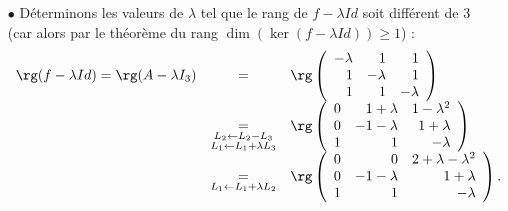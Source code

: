 \documentclass[a4paper, 11pt,reqno]{article}
\begin{document}
\begin{correction}
\begin{enumerate}
		      \begin{itemize}
			      \item[$\bullet$] D\'eterminons les valeurs de $\lambda$ tel que le rang de $f-\lambda Id$ soit diff\'erent de $3$ (car alors par le th\'eor\`eme du rang $\dim(\ker(f-\lambda Id))\geq 1$) :
			            $$ \begin{array}{ccl}
					            \rg(f-\lambda Id) = \rg(A-\lambda I_3) & =                                             & \rg\left(\begin{array}{rrr}
							                                                                                                              -\lambda & 1        & 1        \\
							                                                                                                              1        & -\lambda & 1        \\
							                                                                                                              1        & 1        & -\lambda
						                                                                                                              \end{array}\right) \\
					                                                   & \underset{\substack{L_2 \leftarrow L_2 - L_3                                            \\ L_1 \leftarrow L_1+\lambda L_3}}{=}&
					            \rg\left(\begin{array}{rrr}
							                     0 & 1 + \lambda & 1 - \lambda^2 \\
							                     0 & -1-\lambda  & 1+\lambda     \\
							                     1 & 1           & -\lambda
						                     \end{array}\right)                                                                                         \\
					                                                   & \underset{ L_1 \leftarrow L_1+\lambda L_2}{=} &
					            \rg\left(\begin{array}{rrr}
							                     0 & 0          & 2 +\lambda - \lambda^2 \\
							                     0 & -1-\lambda & 1+\lambda              \\
							                     1 & 1          & -\lambda
						                     \end{array}\right).

\end{array}$$
\end{itemize}
\end{enumerate}
\end{correction}
\end{document}
